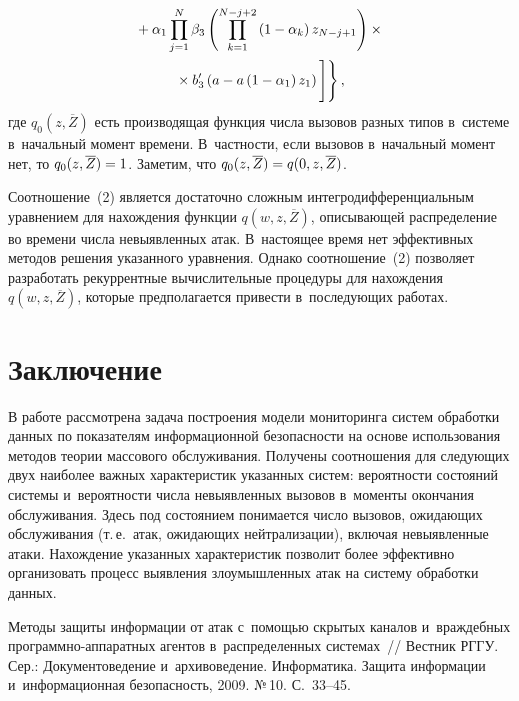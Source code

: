 \begin{multicols}{2}
\noindent
\begin{multline}
{}+
  \alpha_1 \prod\limits^N_{j=1} \beta_3 \left( \prod\limits_{k=1}^{N-j+2}\left( 1-
\alpha_k\right) z_{N-j+1}\right) \times{}\\
{}\times b_3^\prime \left(a-a\left(1-
\alpha_1\right)z_1\right)
  \vphantom{\prod^N_{l=1}}
  \Bigg]\Bigg\}\,,
  \label{e2-sim}
  \end{multline}
где $q_0(z,\overline{Z})$ есть производящая функция числа вызовов разных 
типов в~системе в~начальный момент времени. В~частности, если вызовов 
в~начальный момент нет, то $q_0(z,\overline{Z})\hm=1$. Заметим, что 
$q_0(z,\overline{Z})\hm=q(0,z,\overline{Z})$.
  
  Соотношение~(2) является достаточно сложным  
ин\-тег\-ро\-диф\-фе\-рен\-ци\-аль\-ным уравнением для на\-хож\-де\-ния функции 
$q(w,z,\overline{Z})$, описывающей распределение во времени числа 
невыявленных атак. В~настоящее время нет эффективных методов решения 
указанного уравнения. Однако соотношение~(2) позволяет разработать 
рекуррентные вы\-чис\-ли\-тель\-ные процедуры для нахождения 
$q(w,z,\overline{Z})$, которые предполагается привести в~последующих 
работах.
  
  \section{Заключение}
  
  В работе рассмотрена задача построения модели мониторинга систем 
обработки данных по показателям информационной безопас\-ности на основе 
использования методов теории массового обслуживания. Получены 
соотношения для следующих двух наиболее важных характеристик указанных 
систем: вероятности состояний сис\-те\-мы и~вероятности чис\-ла 
невыявленных вызовов в~моменты окончания обслуживания. Здесь под 
состоянием понимается чис\-ло вызовов, ожидающих обслуживания (т.\,е.\ атак, 
ожидающих нейтрализации), включая невыявленные атаки. Нахождение 
указанных характеристик позволит более эффективно организовать процесс 
выявления злоумышленных атак на сис\-те\-му обработки данных. 
  
{\small\frenchspacing
 {%
 \begin{thebibliography}{9}
 
   Методы защиты информации от атак 
с~помощью скрытых каналов и~враждебных про\-граммно-ап\-па\-рат\-ных агентов 
в~распределенных системах~// Вестник РГГУ. Сер.: Документоведение и~архивоведение. 
Информатика. Защита информации и~информационная безопасность, 2009. №\,10. С.~33--45.


\end{thebibliography}}}
\end{multicols}
